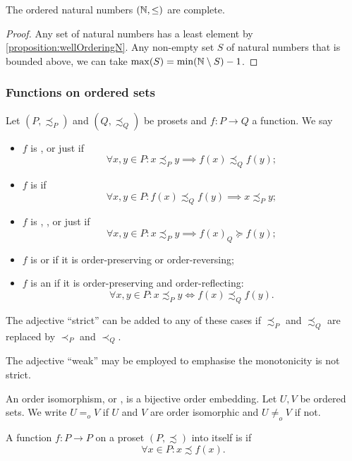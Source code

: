 \begin{lemma}
The ordered natural numbers $(\mathbb{N},\leq)$ are complete.
\end{lemma}
\begin{proof}
Any set of natural numbers has a least element by \ref{proposition:wellOrderingN}. Any non-empty set $S$ of natural numbers that is bounded above, we can take $\max(S) = \min(\mathbb{N}\setminus S)-1$.
\end{proof}

\subsubsection{Functions on ordered sets}
\begin{definition}
Let $(P, \precsim_P)$ and $(Q, \precsim_Q)$ be prosets and $f: P\to Q$ a function. We say
\begin{itemize}
\item $f$ is ,  or just  if
\[ \forall x,y\in P: x\precsim_P y \implies f(x)\precsim_Q f(y); \]
\item $f$ is  if
\[ \forall x,y\in P: f(x)\precsim_Q f(y) \implies x\precsim_P y; \]
\item $f$ is , ,  or just  if
\[ \forall x,y\in P: x\precsim_P y \implies f(x) _Q\succeq f(y); \]
\item $f$ is  or  if it is order-preserving or order-reversing;
\item $f$ is an  if it is order-preserving and order-reflecting:
\[ \forall x,y\in P: x\precsim_P y \iff f(x)\precsim_Q f(y). \]
\end{itemize}
The adjective ``strict'' can be added to any of these cases if $\precsim_P$ and $\precsim_Q$ are replaced by $\prec_P$ and $\prec_Q$.

The adjective ``weak'' may be employed to emphasise the monotonicity is not strict.
\end{definition}
An order isomorphism, or , is a bijective order embedding. Let $U,V$ be ordered sets. We write $U =_o V$ if $U$ and $V$ are order isomorphic and $U \neq_o V$ if not.

\begin{definition}
A function $f: P\to P$ on a proset $(P,\precsim)$ into itself is  if
\[ \forall x\in P: x\precsim f(x). \]
\end{definition}

